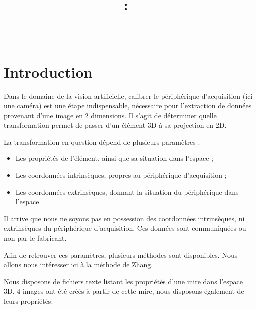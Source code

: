 \documentclass{article}
\title{
\vspace{2in}
\textmd{\textbf{\hmwkClass:\ \hmwkTitle}}\\
\normalsize\vspace{0.1in}\small{\hmwkDueDate}\\
\vspace{3in}
}
\author{\textbf{\hmwkAuthorName}}
\date{} %
\begin{document}
\maketitle



\newpage
\tableofcontents
\newpage


\section{Introduction}

Dans le domaine de la vision artificielle, calibrer le périphérique d'acquisition (ici une caméra) est une étape indispensable, nécessaire pour l'extraction de données provenant d'une image en 2 dimensions.
Il s'agit de déterminer quelle transformation permet de passer d'un élément 3D à sa projection en 2D.

La transformation en question dépend de plusieurs paramètres :
\begin{itemize}
  \item Les propriétés de l'élément, ainsi que sa situation dans l'espace ;
  \item Les coordonnées intrinsèques, propres au périphérique d'acquisition ;
  \item Les coordonnées extrinsèques, donnant la situation du périphérique dans l'espace.
\end{itemize}

Il arrive que nous ne soyons pas en possession des coordonnées intrinsèques, ni extrinsèques du périphérique d'acquisition. Ces données sont communiquées ou non par le fabricant.

Afin de retrouver ces paramètres, plusieurs méthodes sont disponibles. Nous allons nous intéresser ici à la méthode de Zhang.

Nous disposons de fichiers texte listant les propriétés d'une mire dans l'espace 3D. 4 images ont été créés à partir de cette mire, nous disposons également de leurs propriétés.
\end{document}
